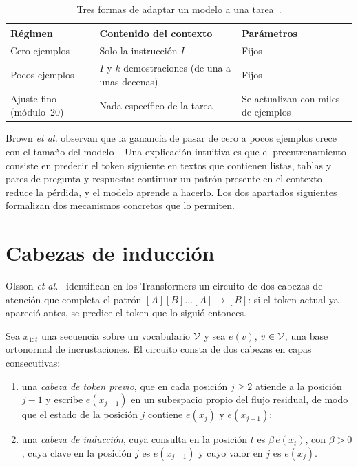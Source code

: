 \begin{table}[h]
\centering\small
\begin{tabularx}{\textwidth}{@{}l>{\raggedright\arraybackslash}X>{\raggedright\arraybackslash}X@{}}
\toprule
Régimen & Contenido del contexto & Parámetros \\
\midrule
Cero ejemplos & Solo la instrucción $I$ & Fijos \\
Pocos ejemplos & $I$ y $k$ demostraciones (de una a unas decenas) & Fijos \\
Ajuste fino (módulo~20) & Nada específico de la tarea & Se actualizan con miles de ejemplos \\
\bottomrule
\end{tabularx}
\caption{Tres formas de adaptar un modelo a una tarea~\cite[§2]{brown}.}
\label{tab:regimenes}
\end{table}

\begin{observacion}
Brown \emph{et al.} observan que la ganancia de pasar de cero a pocos ejemplos crece con el tamaño del modelo~\cite{brown}. Una explicación intuitiva es que el preentrenamiento consiste en predecir el token siguiente en textos que contienen listas, tablas y pares de pregunta y respuesta: continuar un patrón presente en el contexto reduce la pérdida, y el modelo aprende a hacerlo. Los dos apartados siguientes formalizan dos mecanismos concretos que lo permiten.
\end{observacion}

\section{Cabezas de inducción}

Olsson \emph{et al.}~\cite{olsson} identifican en los Transformers un circuito de dos cabezas de atención que completa el patrón $[A][B]\dots[A]\to[B]$: si el token actual ya apareció antes, se predice el token que lo siguió entonces.

\begin{definicion}\label{def:induccion}
Sea $x_{1:t}$ una secuencia sobre un vocabulario $\mathcal{V}$ y sea $e(v)$, $v\in\mathcal{V}$, una base ortonormal de incrustaciones. El circuito consta de dos cabezas en capas consecutivas:
\begin{enumerate}
  \item una \emph{cabeza de token previo}, que en cada posición $j\ge 2$ atiende a la posición $j-1$ y escribe $e(x_{j-1})$ en un subespacio propio del flujo residual, de modo que el estado de la posición $j$ contiene $e(x_j)$ y $e(x_{j-1})$;
  \item una \emph{cabeza de inducción}, cuya consulta en la posición $t$ es $\beta\,e(x_t)$, con $\beta>0$, cuya clave en la posición $j$ es $e(x_{j-1})$ y cuyo valor en $j$ es $e(x_j)$.
\end{enumerate}
\end{definicion}

